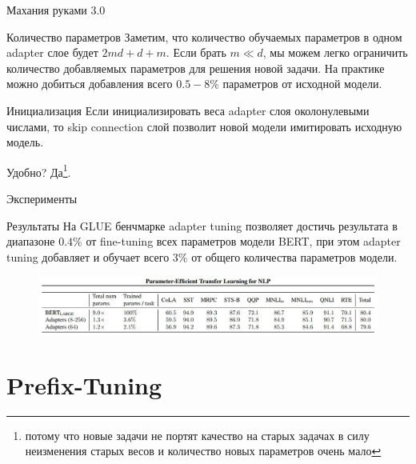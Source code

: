 \documentclass[9pt]{beamer}
\begin{document}
\begin{frame}{Махания руками 3.0}

    \begin{block}{Количество параметров}
        Заметим, что количество обучаемых параметров в одном adapter слое будет $2 m d + d + m$. Если брать $m \ll d$, мы можем легко ограничить количество добавляемых параметров для решения новой задачи. На практике можно добиться добавления всего $0.5 - 8\%$ параметров от исходной модели.
    \end{block}

    \begin{block}{Инициализация}
        Если инициализировать веса adapter слоя околонулевыми числами, то skip connection слой позволит новой модели имитировать исходную модель.
    \end{block}

    \begin{block}{Удобно?}
        Да\footnote{потому что новые задачи не портят качество на старых задачах в силу неизменения старых весов и количество новых параметров очень мало}.
    \end{block}
    
\end{frame}


\begin{frame}{Эксперименты}
    
    \begin{block}{Результаты}
        На GLUE бенчмарке adapter tuning позволяет достичь результата в диапазоне $0.4\%$ от fine-tuning всех параметров модели BERT, при этом adapter tuning добавляет и обучает всего $3\%$ от общего количества параметров модели.
    \end{block}

    \begin{figure}
        \begin{center}
            \includegraphics[scale=0.45]{images/adapter_2.jpg}
        \end{center}
    \end{figure}

\end{frame}


\section{Prefix-Tuning}
\end{document}
